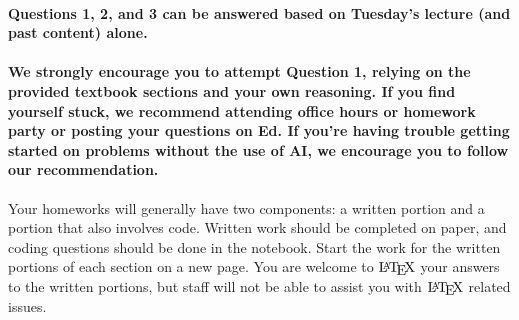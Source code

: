 \documentclass[11pt]{article}
\let\Oldlatex\LaTeX
\renewcommand{\LaTeX}{\textrm{\Oldlatex}}
\begin{document}
\hypertarget{questions-1-2-and-3-can-be-answered-based-on-tuesdays-lecture-and-past-content-alone.}{%
\paragraph{\texorpdfstring{\textbf{Questions 1, 2, and 3 can be answered
based on Tuesday's lecture (and past content)
alone.}}{Questions 1, 2, and 3 can be answered based on Tuesday's lecture (and past content) alone.}}\label{questions-1-2-and-3-can-be-answered-based-on-tuesdays-lecture-and-past-content-alone.}}

\hypertarget{we-strongly-encourage-you-to-attempt-question-1-relying-on-the-provided-textbook-sections-and-your-own-reasoning.-if-you-find-yourself-stuck-we-recommend-attending-office-hours-or-homework-party-or-posting-your-questions-on-ed.-if-youre-having-trouble-getting-started-on-problems-without-the-use-of-ai-we-encourage-you-to-follow-our-recommendation.}{%
\paragraph{\texorpdfstring{\textbf{We strongly encourage you to attempt
Question 1, relying on the provided textbook sections and your own
reasoning. If you find yourself stuck, we recommend attending office
hours or homework party or posting your questions on Ed. If you're
having trouble getting started on problems without the use of AI, we
encourage you to follow our
recommendation.}}{We strongly encourage you to attempt Question 1, relying on the provided textbook sections and your own reasoning. If you find yourself stuck, we recommend attending office hours or homework party or posting your questions on Ed. If you're having trouble getting started on problems without the use of AI, we encourage you to follow our recommendation.}}\label{we-strongly-encourage-you-to-attempt-question-1-relying-on-the-provided-textbook-sections-and-your-own-reasoning.-if-you-find-yourself-stuck-we-recommend-attending-office-hours-or-homework-party-or-posting-your-questions-on-ed.-if-youre-having-trouble-getting-started-on-problems-without-the-use-of-ai-we-encourage-you-to-follow-our-recommendation.}}

Your homeworks will generally have two components: a written portion and
a portion that also involves code. Written work should be completed on
paper, and coding questions should be done in the notebook. Start the
work for the written portions of each section on a new page. You are
welcome to \(\LaTeX\) your answers to the written portions, but staff
will not be able to assist you with \(\LaTeX\) related issues.
\end{document}
